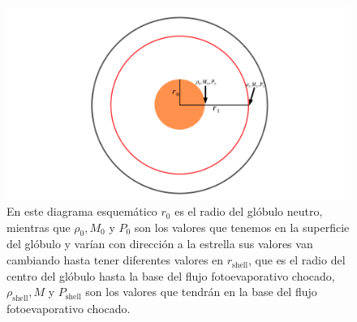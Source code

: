 \documentclass{book}
\begin{document}
\begin{figure}[htb]
    \centering \includegraphics[width=\textwidth]{artesanales/ImgFi01-3.pdf}
    \caption{En este diagrama esquemático $r_0$ es el radio del glóbulo neutro, mientras que $\rho_0,M_0$ y $P_0$ son los valores que tenemos en la superficie del glóbulo y varían con dirección a la estrella sus valores van cambiando hasta tener diferentes valores en $r_\mathrm{shell}$, que es el radio del centro del glóbulo hasta la base del flujo fotoevaporativo chocado, $\rho_\mathrm{shell},M$ y $P_\mathrm{shell}$ son los valores que tendrán en la base del flujo fotoevaporativo chocado.}
    \label{fig:parameters}
\end{figure}
\end{document}
